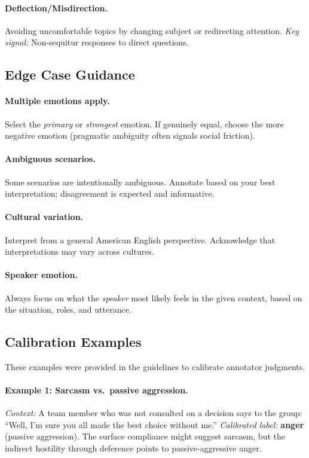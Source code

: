 \documentclass[twoside,11pt]{article}
\begin{document}
\paragraph{Deflection/Misdirection.} Avoiding uncomfortable topics by changing subject or redirecting attention. \textit{Key signal:} Non-sequitur responses to direct questions.

\subsection{Edge Case Guidance}

\paragraph{Multiple emotions apply.} Select the \textit{primary} or \textit{strongest} emotion. If genuinely equal, choose the more negative emotion (pragmatic ambiguity often signals social friction).

\paragraph{Ambiguous scenarios.} Some scenarios are intentionally ambiguous. Annotate based on your best interpretation; disagreement is expected and informative.

\paragraph{Cultural variation.} Interpret from a general American English perspective. Acknowledge that interpretations may vary across cultures.

\paragraph{Speaker emotion.} Always focus on what the \textit{speaker} most likely feels in the given context, based on the situation, roles, and utterance.

\subsection{Calibration Examples}

These examples were provided in the guidelines to calibrate annotator judgments.

\paragraph{Example 1: Sarcasm vs.\ passive aggression.} \textit{Context:} A team member who was not consulted on a decision says to the group: ``Well, I'm sure you all made the best choice without me.'' \textit{Calibrated label:} \textbf{anger} (passive aggression). The surface compliance might suggest sarcasm, but the indirect hostility through deference points to passive-aggressive anger.
\end{document}
